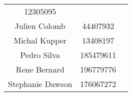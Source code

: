 \documentclass[]{article}
\begin{document}
\begin{longtable}[c]{@{}ccc@{}}
\begin{minipage}[t]{0.13\columnwidth}
12305095
\strut\end{minipage} &
\begin{minipage}[t]{0.13\columnwidth}\centering\strut
\strut\end{minipage}\tabularnewline
\begin{minipage}[t]{0.24\columnwidth}\centering\strut
Julien Colomb
\strut\end{minipage} &
\begin{minipage}[t]{0.13\columnwidth}\centering\strut
44407932
\strut\end{minipage} &
\begin{minipage}[t]{0.13\columnwidth}\centering\strut
\strut\end{minipage}\tabularnewline
\begin{minipage}[t]{0.24\columnwidth}\centering\strut
Michal Kupper
\strut\end{minipage} &
\begin{minipage}[t]{0.13\columnwidth}\centering\strut
13408197
\strut\end{minipage} &
\begin{minipage}[t]{0.13\columnwidth}\centering\strut
\strut\end{minipage}\tabularnewline
\begin{minipage}[t]{0.24\columnwidth}\centering\strut
Pedro Silva
\strut\end{minipage} &
\begin{minipage}[t]{0.13\columnwidth}\centering\strut
185479611
\strut\end{minipage} &
\begin{minipage}[t]{0.13\columnwidth}\centering\strut
\strut\end{minipage}\tabularnewline
\begin{minipage}[t]{0.24\columnwidth}\centering\strut
Rene Bernard
\strut\end{minipage} &
\begin{minipage}[t]{0.13\columnwidth}\centering\strut
196779776
\strut\end{minipage} &
\begin{minipage}[t]{0.13\columnwidth}\centering\strut
\strut\end{minipage}\tabularnewline
\begin{minipage}[t]{0.24\columnwidth}\centering\strut
Stephanie Dawson
\strut\end{minipage} &
\begin{minipage}[t]{0.13\columnwidth}\centering\strut
176067272
\strut\end{minipage} &

\end{longtable}
\end{document}
